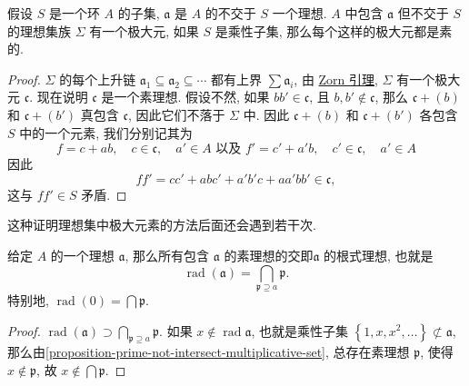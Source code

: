 \begin{proposition}
  \label{proposition-prime-not-intersect-multiplicative-set}
  假设 \( S \) 是一个环 \( A \) 的子集, \( \mathfrak{a} \) 是 \( A \) 的不交于
  \( S \) 一个理想.  \( A \) 中包含 \( \mathfrak{a} \) 但不交于 \( S \)
  的理想集族 \( \Sigma \) 有一个极大元, 如果 \( S \) 是乘性子集,
  那么每个这样的极大元都是素的.
\end{proposition}
\begin{proof}
  \( \Sigma \) 的每个上升链 \( \mathfrak{a}_1 \subseteq \mathfrak{a}_2 \subseteq
  \cdots \) 都有上界 \( \sum \mathfrak{a}_i \), 由
  \href{https://en.wikipedia.org/wiki/Zorn%27s_lemma}{Zorn 引理}, \( \Sigma \)
  有一个极大元 \( \mathfrak{c} \).
  现在说明 \( \mathfrak{c} \) 是一个素理想.
  假设不然, 如果 \( b b' \in \mathfrak{c} \), 且 \( b, b' \notin \mathfrak{c}
  \), 那么 \( \mathfrak{c} + (b) \) 和 \( \mathfrak{c} + (b') \) 真包含 \(
  \mathfrak{c} \), 因此它们不落于 \( \Sigma \) 中.
  因此 \( \mathfrak{c} + (b) \) 和 \( \mathfrak{c} + (b') \) 各包含 \( S \)
  中的一个元素, 我们分别记其为
  \[
    f = c + ab,\quad c \in \mathfrak{c},\quad a' \in A \text{ 以及 } f' = c' +
    a'b,\quad c' \in \mathfrak{c},\quad a' \in A
  \]
  因此
  \[
    f f' = c c' + abc' + a'b'c + aa'bb' \in \mathfrak{c},
  \]
  这与 \( f f' \in S \) 矛盾.
\end{proof}
\begin{remark}
  \label{remark-maximal-element-prime}
  这种证明理想集中极大元素的方法后面还会遇到若干次.
\end{remark}

\begin{proposition}
  \label{proposition-radical-as-prime-intersection}
  给定 \( A \) 的一个理想 \( \mathfrak{a} \), 那么所有包含 \( \mathfrak{a} \)
  的素理想的交即\( \mathfrak{a} \) 的根式理想, 也就是
  \[
    \operatorname{rad}(\mathfrak{a}) = \bigcap_{\mathfrak{p}\supseteq a}
    \mathfrak{p}.
  \]
  特别地, \( \operatorname{rad}(0) = \bigcap \mathfrak{p} \).
\end{proposition}
\begin{proof}
  \( \operatorname{rad}(\mathfrak{a}) \supset \bigcap_{\mathfrak{p}\supseteq a}
  \mathfrak{p} \).
  如果 \( x \notin \operatorname{rad} \mathfrak{a} \), 也就是乘性子集 \(
  \left\lbrace 1, x, x^2, \ldots \right\rbrace \not\subset \mathfrak{a} \),
  那么由\cref{proposition-prime-not-intersect-multiplicative-set}, 总存在素理想
  \(  \mathfrak{p} \), 使得 \( x \notin \mathfrak{p} \), 故 \( x \notin \bigcap
  \mathfrak{p} \).
\end{proof}

